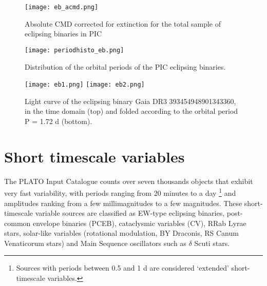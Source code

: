 \begin{comment}
\begin{figure}[H]
\centering
\texttt{[image: eb\_cmd.png]}
\caption{Absolute CMD corrected for extinction for the eclipsing binaries in LOPN1}
\label{fig:Absolute CMD corrected for extinction for the eclipsing binaries in LOPN1}
\end{figure}


\begin{figure}[H]
\centering
\texttt{[image: eb2\_cmd.png]}
\caption{Absolute CMD corrected for extinction for the eclipsing binaries in LOPS2}
\label{fig:Absolute CMD corrected for extinction for the eclipsing binaries in LOPS2}
\end{figure}
\end{comment}

\begin{figure}[H]
\centering
\texttt{[image: eb\_acmd.png]}
\caption{Absolute CMD corrected for extinction for the total sample of eclipsing binaries in PIC}
\label{fig:Absolute CMD corrected for extinction for the total sample of eclipsing binaries in PIC}
\end{figure}


\begin{figure}[H]
\centering
\texttt{[image: periodhisto\_eb.png]}
\caption{Distribution of the orbital periods of the PIC eclipsing binaries. }
\label{fig:periodhisto_eb}
\end{figure}




\begin{figure}[H]
\centering
\texttt{[image: eb1.png]}
\texttt{[image: eb2.png]}
\caption{Light curve of the eclipsing binary Gaia DR3 393454948901343360, in the time domain (top) and folded according to the orbital period P = 1.72 d (bottom).}
\label{fig:binary}
\end{figure}




\newpage


\section{Short timescale variables}

The PLATO Input Catalogue counts over seven thousands objects that exhibit very fast variability, with periods ranging from 20 minutes to a day \footnote{Sources with periods between 0.5 and 1 d are considered ‘extended’ short-
timescale variables.} and amplitudes ranking from a few millimagnitudes to a few magnitudes.
These short-timescale variable sources are classified as EW-type eclipsing binaries, post-common envelope binaries (PCEB), cataclysmic variables (CV), RRab Lyrae stars, solar-like variables (rotational modulation, BY Draconis, RS Canum Venaticorum stars) and Main Sequence oscillators such as $\delta$ Scuti stars.

